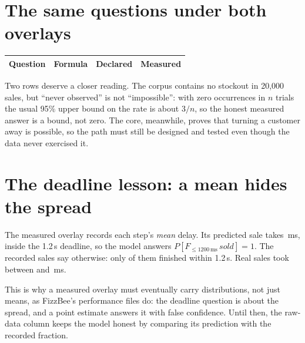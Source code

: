 \section{The same questions under both overlays}

\begin{bakerytable}
\small
\begin{tabular}{p{.24\linewidth}p{.22\linewidth}p{.2\linewidth}p{.24\linewidth}}
\textbf{Question} & \textbf{Formula} & \textbf{Declared} & \textbf{Measured}\\
\hline

\end{tabular}
\caption{One unchanged core, two overlays. The first two rows need no numbers at all.}
\label{tab:bakery-answers}
\end{bakerytable}

Two rows deserve a closer reading. The corpus contains no stockout in
20{,}000 sales, but ``never observed'' is not ``impossible'': with zero
occurrences in $n$ trials the usual 95\% upper bound on the rate is about
$3/n$, so the honest measured answer is a bound, not zero. The core, meanwhile,
proves that turning a customer away is possible, so the path must still be
designed and tested even though the data never exercised it.

\section{The deadline lesson: a mean hides the spread}

The measured overlay records each step's \emph{mean} delay. Its predicted sale
takes \BakeryMeanSaleMs{}\,ms, inside the 1.2\,s deadline, so the model answers
$P[F_{\le 1200\,\mathrm{ms}}\,\mathit{sold}] = 1$. The recorded sales say
otherwise: only \BakeryWithinDeadline{} of them finished within 1.2\,s. Real
sales took between \BakeryMinSaleMs{} and \BakeryMaxSaleMs{}\,ms.

\begin{bakeryfigure}
\caption{Duration of every recorded sale. The mean sits just inside the
deadline; almost half of the sales do not.}
\label{fig:bakery-durations}
\end{bakeryfigure}

This is why a measured overlay must eventually carry distributions, not just
means, as FizzBee's performance files do: the deadline question is about the
spread, and a point estimate answers it with false confidence. Until then, the
raw-data column keeps the model honest by comparing its prediction with the
recorded fraction.

